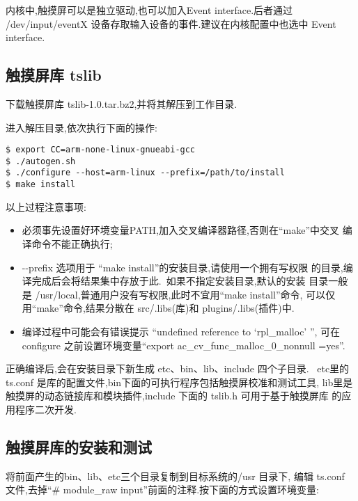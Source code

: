 	内核中,触摸屏可以是独立驱动,也可以加入Event interface.后者通过
 /dev/input/eventX 设备存取输入设备的事件.建议在内核配置中也选中
 Event interface.

\subsection{触摸屏库 tslib}
	下载触摸屏库 tslib-1.0.tar.bz2,并将其解压到工作目录.

	进入解压目录,依次执行下面的操作:

\begin{boxedminipage}{.9\textwidth}
\begin{verbatim}
$ export CC=arm-none-linux-gnueabi-gcc
$ ./autogen.sh
$ ./configure --host=arm-linux --prefix=/path/to/install
$ make install
\end{verbatim}
\end{boxedminipage}

	以上过程注意事项:
\begin{itemize}
  \item 必须事先设置好环境变量PATH,加入交叉编译器路径,否则在``make''中交叉
	编译命令不能正确执行;
  \item -{}-prefix 选项用于 ``make install''的安装目录,请使用一个拥有写权限
	的目录,编译完成后会将结果集中存放于此.~如果不指定安装目录,默认的安装
	目录一般是 /usr/local,普通用户没有写权限,此时不宜用``make install''命令,
	可以仅用``make''命令,结果分散在 src/.libs(库)和 plugins/.libs(插件)中.
  \item 编译过程中可能会有错误提示 ``undefined reference to `rpl\_malloc' '',
	可在 configure 之前设置环境变量``export ac\_cv\_func\_malloc\_0\_nonnull
	=yes''.
\end{itemize}

	正确编译后,会在安装目录下新生成 etc、bin、lib、include 四个子目录.
~etc里的 ts.conf 是库的配置文件,bin下面的可执行程序包括触摸屏校准和测试工具,
lib里是触摸屏的动态链接库和模块插件,include 下面的 tslib.h 可用于基于触摸屏库
的应用程序二次开发.

\subsection{触摸屏库的安装和测试}
	将前面产生的bin、lib、etc三个目录复制到目标系统的/usr 目录下, 编辑 ts.conf
文件,去掉``\# module\_raw input''前面的注释.按下面的方式设置环境变量:


